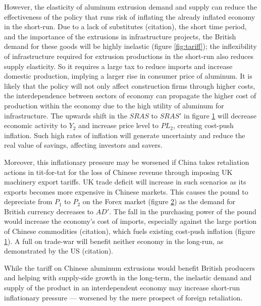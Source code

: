 \documentclass[a4paper,12pt]{article}
\newcommand{\tikzfig}[1]{}
\begin{document}
\begin{figure}[H]
    \centering
    \tikzfig{assets/eco.txt}
    \caption{}
    \label{fig:eco}
\end{figure}
However, the elasticity of aluminum extrusion demand and supply can reduce the effectiveness of the policy that runs risk of inflating the already inflated economy in the short-run. Due to a lack of substitutes (citation), the short time period, and the importance of the extrusions in infrastructure projects, the British demand for these goods will be highly inelastic (figure \ref{fig:tariff}); the inflexibility of infrastructure required for extrusion productions in the short-run also reduces supply elasticity. So it requires a large tax to reduce imports and increase domestic production, implying a larger rise in consumer price of aluminum. It is likely that the policy will not only affect construction firms through higher costs, the interdependence between sectors of economy can propagate the higher cost of production within the economy due to the high utility of aluminum for infrastructure. The upwards shift in the $SRAS$ to $SRAS'$ in figure \ref{fig:eco} will decrease economic activity to $Y_2$ and increase price level to $PL_2$, creating cost-push inflation. Such high rates of inflation will generate uncertainty and reduce the real value of savings, affecting investors and savers.



\begin{figure}[H]
    \centering
    \tikzfig{assets/forex.txt}
    \caption{}
    \label{fig:forex}
\end{figure}

Moreover, this inflationary pressure may be worsened if China takes retaliation actions in tit-for-tat for the loss of Chinese revenue through imposing UK machinery export tariffs. UK trade deficit will increase in such scenarios as its exports becomes more expensive in Chinese markets. This causes the pound to depreciate from $P_1$ to $P_2$ on the Forex market (figure \ref{fig:forex}) as the demand for British currency decreases to $AD'$. The fall in the purchasing power of the pound would increase the economy's cost of imports, especially against the large portion of Chinese commodities (citation), which fuels existing cost-push inflation (figure \ref{fig:eco}). A full on trade-war will benefit neither economy in the long-run, as demonstrated by the US (citation).

While the tariff on Chinese aluminum extrusions would benefit British producers and helping with supply-side growth in the long-term, the inelastic demand and supply of the product in an interdependent economy may increase short-run inflationary pressure --- worsened by the mere prospect of foreign retaliation.
\end{document}
